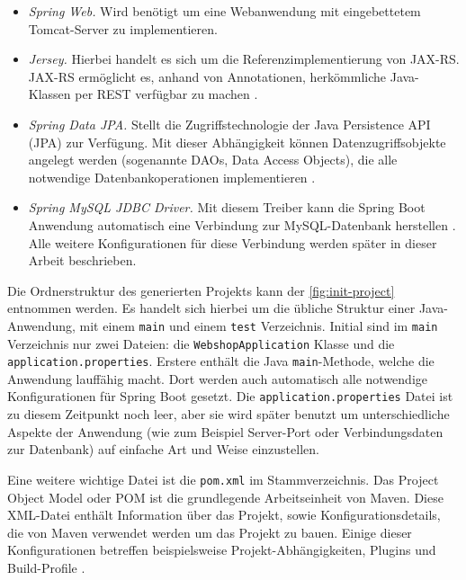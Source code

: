 \begin{itemize}
	\item \textit{Spring Web.} Wird benötigt um eine Webanwendung mit eingebettetem Tomcat-Server zu implementieren.
	\item \textit{Jersey.} Hierbei handelt es sich um die Referenzimplementierung von JAX-RS. JAX-RS ermöglicht es, anhand von Annotationen, herkömmliche Java-Klassen per REST verfügbar zu machen \cite{Oracle2015}.
	\item \textit{Spring Data JPA.} Stellt die Zugriffstechnologie der Java Persistence API (\acs{JPA}) zur Verfügung. Mit dieser Abhängigkeit können Datenzugriffsobjekte angelegt werden (sogenannte \acs{DAO}s, Data Access Objects), die alle notwendige Datenbankoperationen implementieren \cite{Webb2017}.
	\item \textit{Spring MySQL JDBC Driver.} Mit diesem Treiber kann die Spring Boot Anwendung automatisch eine Verbindung zur MySQL-Datenbank herstellen \cite{Webb2017}. Alle weitere Konfigurationen für diese Verbindung werden später in dieser Arbeit beschrieben.
\end{itemize}

Die Ordnerstruktur des generierten Projekts kann der \cref{fig:init-project} entnommen werden.
Es handelt sich hierbei um die übliche Struktur einer Java-Anwendung, mit einem \texttt{main} und einem \texttt{test} Verzeichnis.
Initial sind im \texttt{main} Verzeichnis nur zwei Dateien: die \texttt{WebshopApplication} Klasse und die \texttt{application.properties}.
Erstere enthält die Java \texttt{main}-Methode, welche die Anwendung lauffähig macht.
Dort werden auch automatisch alle notwendige Konfigurationen für Spring Boot gesetzt.
Die \texttt{application.properties} Datei ist zu diesem Zeitpunkt noch leer, aber sie wird später benutzt um unterschiedliche Aspekte der Anwendung (wie zum Beispiel Server-Port oder Verbindungsdaten zur Datenbank) auf einfache Art und Weise einzustellen.

Eine weitere wichtige Datei ist die \texttt{pom.xml} im Stammverzeichnis. Das Project Object Model oder \acs{POM} ist die grundlegende Arbeitseinheit von Maven.
Diese XML-Datei enthält Information über das Projekt, sowie Konfigurationsdetails, die von Maven verwendet werden um das Projekt zu bauen.
Einige dieser Konfigurationen betreffen beispielsweise Projekt-Abhängigkeiten, Plugins und Build-Profile \cite{Foundation2017}.

